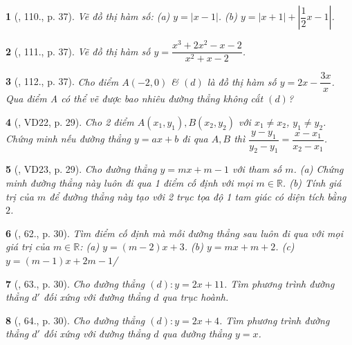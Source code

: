 \documentclass{article}
\newtheorem{baitoan}{}
\begin{document}
\begin{baitoan}[\cite{Tuyen_Toan_9_old}, 110., p. 37]
	Vẽ đồ thị hàm số: (a) $y = |x - 1|$. (b) $y = |x + 1| + \left|\dfrac{1}{2}x - 1\right|$.
\end{baitoan}

\begin{baitoan}[\cite{Tuyen_Toan_9_old}, 111., p. 37]
	Vẽ đồ thị hàm số $y = \dfrac{x^3 + 2x^2 - x - 2}{x^2 + x - 2}$.
\end{baitoan}

\begin{baitoan}[\cite{Tuyen_Toan_9_old}, 112., p. 37]
	Cho điểm $A(-2,0)$ \& $(d)$ là đồ thị hàm số $y = 2x - \dfrac{3x}{x}$. Qua điểm A có thể vẽ được bao nhiêu đường thẳng không cắt $(d)$?
\end{baitoan}

\begin{baitoan}[\cite{Binh_Toan_9_tap_1}, VD22, p. 29]
	Cho 2 điểm $A(x_1,y_1),B(x_2,y_2)$ với $x_1\ne x_2$, $y_1\ne y_2$. Chứng minh nếu đường thẳng $y = ax + b$ đi qua $A,B$ thì $ \dfrac{y - y_1}{y_2 - y_1} = \dfrac{x - x_1}{x_2 - x_1}$.
\end{baitoan}

\begin{baitoan}[\cite{Binh_Toan_9_tap_1}, VD23, p. 29]
	Cho đường thẳng $y = mx + m - 1$ với tham số $m$. (a) Chứng minh đường thẳng này luôn đi qua 1 điểm cố định với mọi $m\in\mathbb{R}$. (b) Tính giá trị của $m$ để đường thẳng này tạo với 2 trục tọa độ 1 tam giác có diện tích bằng $2$.
\end{baitoan}

\begin{baitoan}[\cite{Binh_Toan_9_tap_1}, 62., p. 30]
	Tìm điểm cố định mà mỗi đường thẳng sau luôn đi qua với mọi giá trị của $m\in\mathbb{R}$: (a) $y = (m - 2)x + 3$. (b) $y = mx + m + 2$. (c) $y = (m - 1)x + 2m - 1$/
\end{baitoan}

\begin{baitoan}[\cite{Binh_Toan_9_tap_1}, 63., p. 30]
	Cho đường thẳng $(d):y = 2x + 11$. Tìm phương trình đường thẳng $d'$ đối xứng với đường thẳng $d$ qua trục hoành.
\end{baitoan}

\begin{baitoan}[\cite{Binh_Toan_9_tap_1}, 64., p. 30]
	Cho đường thẳng $(d):y = 2x + 4$. Tìm phương trình đường thẳng $d'$ đối xứng với đường thẳng $d$ qua đường thẳng $y = x$.
\end{baitoan}
\end{document}

